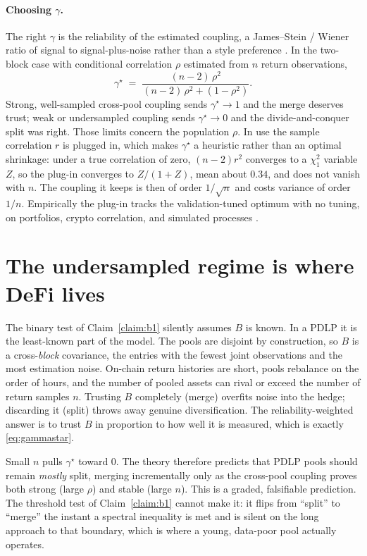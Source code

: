 \documentclass[11pt]{article}
\theoremstyle{definition}
\begin{document}
\paragraph{Choosing $\gamma$.} The right $\gamma$ is the reliability of the
estimated coupling, a James--Stein / Wiener ratio of signal to signal-plus-noise
rather than a style preference \citep{cotton2026}. In the two-block case with
conditional correlation $\rho$ estimated from $n$ return observations,
\begin{equation}
\label{eq:gammastar}
  \gamma^\star \;=\; \frac{(n-2)\,\rho^2}{(n-2)\,\rho^2 + (1-\rho^2)} .
\end{equation}
Strong, well-sampled cross-pool coupling sends $\gamma^\star\to 1$ and the merge
deserves trust; weak or undersampled coupling sends $\gamma^\star\to 0$ and the
divide-and-conquer split was right. Those limits concern the population
$\rho$. In use the sample correlation $r$ is plugged in, which makes
$\gamma^\star$ a heuristic rather than an optimal shrinkage: under a true
correlation of zero, $(n-2)r^2$ converges to a $\chi^2_1$ variable $Z$, so the
plug-in converges to $Z/(1+Z)$, mean about $0.34$, and does not vanish with
$n$. The coupling it keeps is then of order $1/\sqrt n$ and costs variance of
order $1/n$. Empirically the plug-in tracks the validation-tuned optimum with
no tuning, on portfolios, crypto correlation, and simulated processes
\citep{cotton2024,cotton2026}.

\section{The undersampled regime is where DeFi lives}

The binary test of Claim~\ref{claim:b1} silently assumes $B$ is known. In a PDLP
it is the least-known part of the model. The pools are disjoint by construction,
so $B$ is a cross-\emph{block} covariance, the entries with the fewest joint
observations and the most estimation noise. On-chain return histories are short,
pools rebalance on the order of hours, and the number of pooled assets can rival
or exceed the number of return samples $n$. Trusting $B$ completely (merge)
overfits noise into the hedge; discarding it (split) throws away genuine
diversification. The reliability-weighted answer is to trust $B$ in proportion to
how well it is measured, which is exactly \eqref{eq:gammastar}.

Small $n$ pulls $\gamma^\star$ toward $0$. The theory therefore predicts that
PDLP pools should remain \emph{mostly} split, merging incrementally only as the
cross-pool coupling proves both strong (large $\rho$) and stable (large $n$).
This is a graded, falsifiable prediction. The threshold test of
Claim~\ref{claim:b1} cannot make it: it flips from ``split'' to ``merge'' the
instant a spectral inequality is met and is silent on the long approach to that
boundary, which is where a young, data-poor pool actually operates.
\end{document}

